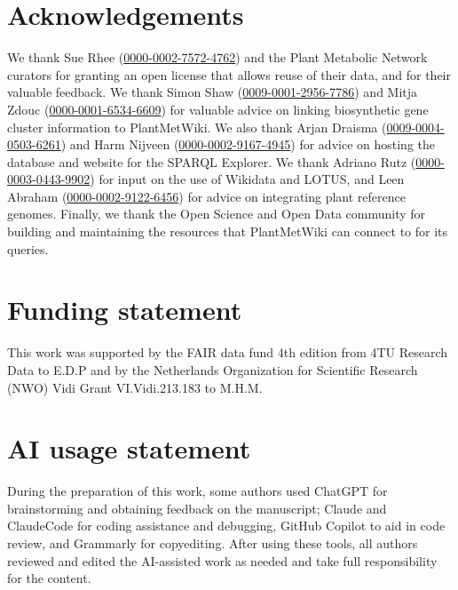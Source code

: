 \documentclass[11pt,a4paper]{article}
\begin{document}
\section*{Acknowledgements}

We thank Sue Rhee (\href{https://orcid.org/0000-0002-7572-4762}{0000-0002-7572-4762}) and the Plant
Metabolic Network curators for granting an open license that allows reuse of their data, and for
their valuable feedback. We thank Simon Shaw
(\href{https://orcid.org/0009-0001-2956-7786}{0009-0001-2956-7786}) and Mitja Zdouc
(\href{https://orcid.org/0000-0001-6534-6609}{0000-0001-6534-6609}) for valuable advice on linking
biosynthetic gene cluster information to PlantMetWiki. We also thank Arjan Draisma
(\href{https://orcid.org/0009-0004-0503-6261}{0009-0004-0503-6261}) and Harm Nijveen
(\href{https://orcid.org/0000-0002-9167-4945}{0000-0002-9167-4945}) for advice on hosting the
database and website for the SPARQL Explorer. We thank Adriano Rutz
(\href{https://orcid.org/0000-0003-0443-9902}{0000-0003-0443-9902}) for input on the use of Wikidata
and LOTUS, and Leen Abraham (\href{https://orcid.org/0000-0002-9122-6456}{0000-0002-9122-6456}) for
advice on integrating plant reference genomes. Finally, we thank the Open Science and Open Data
community for building and maintaining the resources that PlantMetWiki can connect to for its
queries.

\section*{Funding statement}

This work was supported by the FAIR data fund 4th edition from 4TU Research Data to E.D.P and by the
Netherlands Organization for Scientific Research (NWO) Vidi Grant VI.Vidi.213.183 to M.H.M.

\section*{AI usage statement}

During the preparation of this work, some authors used ChatGPT for brainstorming and obtaining
feedback on the manuscript; Claude and ClaudeCode for coding assistance and debugging, GitHub
Copilot to aid in code review, and Grammarly for copyediting. After using these tools, all authors reviewed and edited the AI-assisted work as needed and take full responsibility for the content.
\end{document}

